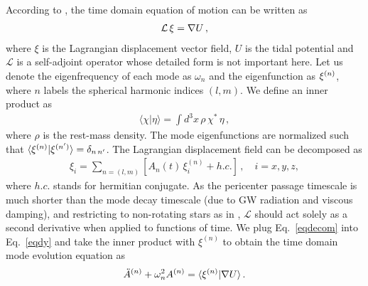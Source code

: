 \documentclass[prd,aps,floatfix,superscriptaddress,nofootinbib,twocolumn,10pt,English]{revtex4}
\begin{document}
According to \cite{press1977formation}, the time domain equation of motion can be written as
\begin{align}\label{eqdy}
\mathcal{L}\,{\bf \xi} = \nabla U\,,
\end{align}
where 
$\xi$ is the Lagrangian displacement vector field, $U$ is the tidal potential 
and $\mathcal{L}$ is a self-adjoint operator whose detailed form is not important here. 
Let us denote the eigenfrequency of each mode as $\omega_n$ and the eigenfunction as ${\bf \xi}^{(n)}$,
where $n$ labels the spherical harmonic indices $(l,m)$. 
We define an  inner product as
 \begin{align}
 \langle \chi | \eta \rangle = \int d^3 x\, \rho\, \chi^*\, \eta\,,
 \end{align}
 where $\rho$ is the rest-mass density.
 The mode eigenfunctions are normalized such that $\langle {\bf \xi}^{(n)} | {\bf \xi}^{(n')} \rangle =\delta_{n\,n'}$.
 The Lagrangian displacement field can be decomposed as
\begin{align}\label{eqdecom}
 \xi_i =\sum_{n =(l,m)} \left [A_n(t)\,\xi^{(n)}_i+h.c. \right ]\,,\quad i=x,y,z,
 \end{align}
%
where $h.c.$ stands for hermitian conjugate.
As the pericenter passage timescale is much shorter than the mode decay
timescale (due to GW radiation and viscous damping), and restricting to
non-rotating stars as in \cite{chirenti2016gravitational,press1977formation},
$\mathcal{L}$ 
should act solely as a second derivative when applied to functions of time.
We plug Eq.~\eqref{eqdecom} into
Eq.~\eqref{eqdy} and take the inner product with $\xi^{(n)}$ 
to obtain the time domain mode evolution equation as 
\begin{align}\label{eqmodeeom} 
\ddot A^{(n)}+\omega^2_n A^{(n)} = \langle {\bf \xi}^{(n)} | \nabla U \rangle\,.
\end{align}
 
\end{document}
